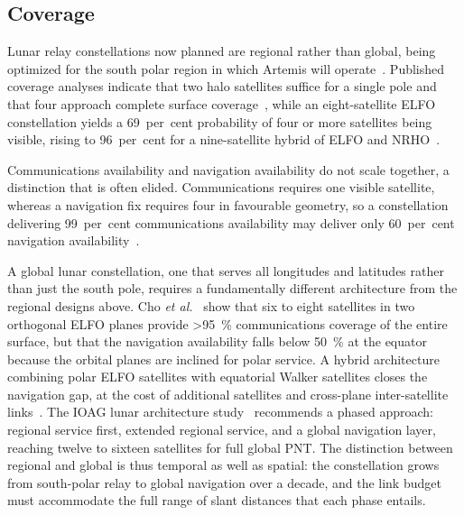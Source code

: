 \documentclass[11pt,a4paper]{article}
\begin{document}
\subsection{Coverage}
Lunar relay constellations now planned are regional rather than global, being optimized for the south polar region in which Artemis will operate~\cite{lcrns_ref_const,esa_moonlight_csc}. Published coverage analyses indicate that two halo satellites suffice for a single pole and that four approach complete surface coverage~\cite{gao_halo_coverage}, while an eight-satellite ELFO constellation yields a 69~per~cent probability of four or more satellites being visible, rising to 96~per~cent for a nine-satellite hybrid of ELFO and NRHO~\cite{zhang_elfo_occlusion}.

Communications availability and navigation availability do not scale together, a distinction that is often elided. Communications requires one visible satellite, whereas a navigation fix requires four in favourable geometry, so a constellation delivering 99~per~cent communications availability may deliver only 60~per~cent navigation availability~\cite{sairo_dop,baweja_dop}.

A global lunar constellation, one that serves all longitudes and latitudes rather than just the south pole, requires a fundamentally different architecture from the regional designs above. Cho \emph{et al.}~\cite{cho_relay_coverage} show that six to eight satellites in two orthogonal ELFO planes provide \SI{>95}{\percent} communications coverage of the entire surface, but that the navigation availability falls below \SI{50}{\percent} at the equator because the orbital planes are inclined for polar service. A hybrid architecture combining polar ELFO satellites with equatorial Walker satellites closes the navigation gap, at the cost of additional satellites and cross-plane inter-satellite links~\cite{yuan_hybrid_cislunar}. The IOAG lunar architecture study~\cite{ioag_lunar_arch} recommends a phased approach: regional service first, extended regional service, and a global navigation layer, reaching twelve to sixteen satellites for full global PNT. The distinction between regional and global is thus temporal as well as spatial: the constellation grows from south-polar relay to global navigation over a decade, and the link budget must accommodate the full range of slant distances that each phase entails.
\end{document}
